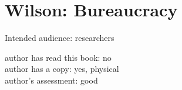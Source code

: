 \section{Wilson: Bureaucracy}

\cite{1991_Wilson}

Intended audience: researchers

author has read this book: no\\
author has a copy: yes, physical\\
author's assessment: good